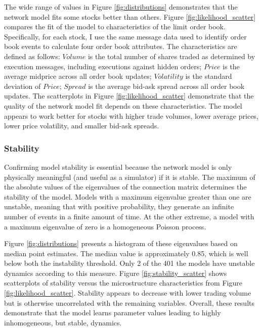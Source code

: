 			The wide range of values in Figure \ref{fig:distributions} demonstrates that the network model fits some stocks better than others. Figure \ref{fig:likelihood_scatter} compares the fit of the model to characteristics of the limit order book. Specifically, for each stock, I use the same message data used to identify order book events to calculate four order book attributes. The characteristics are defined as follows: $Volume$ is the total number of shares traded as determined by execution messages, including executions against hidden orders; $Price$ is the average midprice across all order book updates; $Volatility$ is the standard deviation of $Price$; $Spread$ is the average bid-ask spread across all order book updates. The scatterplots in Figure \ref{fig:likelihood_scatter} demonstrate that the quality of the network model fit depends on these characteristics. The model appears to work better for stocks with higher trade volumes, lower average prices, lower price volatility, and smaller bid-ask spreads.

		\subsubsection{Stability}
			Confirming model stability is essential because the network model is only physically meaningful (and useful as a simulator) if it is stable. The maximum of the absolute values of the eigenvalues of the connection matrix determines the stability of the model. Models with a maximum eigenvalue greater than one are unstable, meaning that with positive probability, they generate an infinite number of events in a finite amount of time. At the other extreme, a model with a maximum eigenvalue of zero is a homogeneous Poisson process.

 			Figure \ref{fig:distributions} presents a histogram of these eigenvalues based on median point estimates. The median value is approximately 0.85, which is well below both the instability threshold. Only 2 of the 401 the models have unstable dynamics according to this measure. Figure \ref{fig:stability_scatter} shows scatterplots of stability versus the microstructure characteristics from Figure \ref{fig:likelihood_scatter}. Stability appears to decrease with lower trading volume but is otherwise uncorrelated with the remaining variables. Overall, these results demonstrate that the model learns parameter values leading to highly inhomogeneous, but stable, dynamics.

